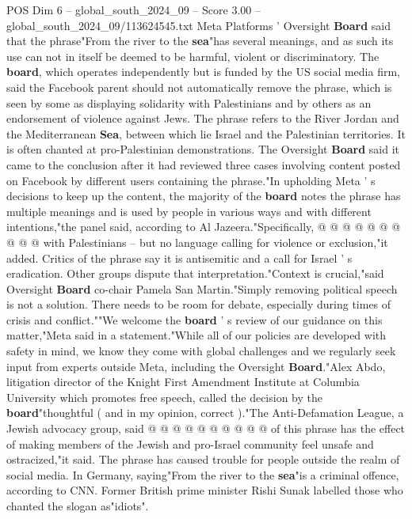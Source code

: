 \begin{textsample}{POS Dim 6 – global\_south\_2024\_09 – Score 3.00 – global\_south\_2024\_09/113624545.txt}  \label{ex:f6_pos_424}
Meta Platforms ' Oversight \textbf{Board} said that the phrase"From the river to the \textbf{sea}"has several meanings, and as such its use can not in itself be deemed to be harmful, violent or discriminatory.
The \textbf{board}, which operates independently but is funded by the US social media firm, said the Facebook parent should not automatically remove the phrase, which is seen by some as displaying solidarity with Palestinians and by others as an endorsement of violence against Jews.
The phrase refers to the River Jordan and the Mediterranean \textbf{Sea}, between which lie Israel and the Palestinian territories.
It is often chanted at pro-Palestinian demonstrations.
The Oversight \textbf{Board} said it came to the conclusion after it had reviewed three cases involving content posted on Facebook by different users containing the phrase."In upholding Meta ' s decisions to keep up the content, the majority of the \textbf{board} notes the phrase has multiple meanings and is used by people in various ways and with different intentions,"the panel said, according to Al Jazeera."Specifically, @ @ @ @ @ @ @ @ @ @ with Palestinians -- but no language calling for violence or exclusion,"it added.
Critics of the phrase say it is antisemitic and a call for Israel ' s eradication.
Other groups dispute that interpretation."Context is crucial,"said Oversight \textbf{Board} co-chair Pamela San Martin."Simply removing political speech is not a solution.
There needs to be room for debate, especially during times of crisis and conflict.""We welcome the \textbf{board} ' s review of our guidance on this matter,"Meta said in a statement."While all of our policies are developed with safety in mind, we know they come with global challenges and we regularly seek input from experts outside Meta, including the Oversight \textbf{Board}."Alex Abdo, litigation director of the Knight First Amendment Institute at Columbia University which promotes free speech, called the decision by the \textbf{board}"thoughtful ( and in my opinion, correct )."The Anti-Defamation League, a Jewish advocacy group, said @ @ @ @ @ @ @ @ @ @ of this phrase has the effect of making members of the Jewish and pro-Israel community feel unsafe and ostracized,"it said.
The phrase has caused trouble for people outside the realm of social media.
In Germany, saying"From the river to the \textbf{sea}"is a criminal offence, according to CNN.
Former British prime minister Rishi Sunak labelled those who chanted the slogan as"idiots".

\end{textsample}
